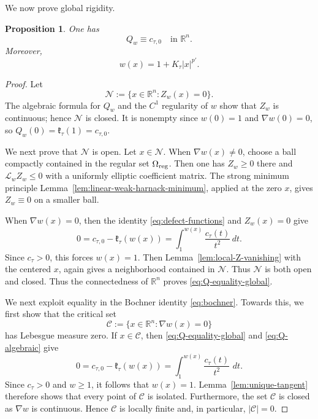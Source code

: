 \documentclass[reqno,12pt]{amsart}
\numberwithin{equation}{section}
\newtheorem{prop}[thm]{Proposition}
\theoremstyle{remark}
\newcommand{\R}{\mathbb R}
\newcommand{\dd}{\,d}
\newcommand{\Lscr}{\mathscr L}
\begin{document}
We now prove global rigidity.
\begin{prop}\label{prop:global-rigidity}
One has
\begin{equation}\label{eq:Q-equality-global}
Q_w\equiv c_{\tau,0}
\quad\text{in }\R^n.
\end{equation}
Moreover,
\begin{equation}\label{eq:w-explicit}
w(x)=1+K_\tau|x|^{p'}.
\end{equation}
\end{prop}

\begin{proof}
Let
$$
\mathcal N:=\{x\in\R^n:Z_w(x)=0\}.
$$
The algebraic formula for $Q_w$ and the $C^1$ regularity of $w$ show that $Z_w$ is continuous; hence $\mathcal N$ is closed.  It is nonempty since $w(0)=1$ and $\nabla w(0)=0$, so
$Q_w(0)=\mathfrak k_\tau(1)=c_{\tau,0}$.

We next prove that $\mathcal N$ is open.  Let $x\in\mathcal N$.  When $\nabla w(x)\ne0$, choose a ball compactly contained in the regular set $\Omega_{\rm reg}$.  Then one has $Z_w\ge 0$ there and $\Lscr_wZ_w\le0$ with a uniformly elliptic coefficient matrix.  The strong minimum principle Lemma~\ref{lem:linear-weak-harnack-minimum}, applied at the zero $x$, gives $Z_w\equiv0$ on a smaller ball.  

When $\nabla w(x)=0$, then the   identity \eqref{eq:defect-functions} and $Z_w(x)=0$ give
$$
 0=c_{\tau,0}-\mathfrak k_\tau(w(x))    =\int_1^{w(x)}\frac{c_\tau(t)}{t^2}\dd t.
$$
Since $c_\tau>0$, this forces $w(x)=1$. Then  Lemma~\ref{lem:local-Z-vanishing} with the centered  $x$, again gives a neighborhood contained in
$\mathcal N$.  Thus $\mathcal N$ is both open and closed.  Thus the connectedness of $\R^n$ proves \eqref{eq:Q-equality-global}.

We next exploit equality in the Bochner identity \eqref{eq:bochner}. 
Towards this, we first show that the critical set
$$
    \mathcal C:=\{x\in\R^n:\nabla w(x)=0\}
$$
has Lebesgue measure zero.  If $x\in\mathcal C$, then
\eqref{eq:Q-equality-global} and \eqref{eq:Q-algebraic} give
$$
0=c_{\tau,0}-\mathfrak k_\tau(w(x))
= \int_1^{w(x)}\frac{c_\tau(t)}{t^2}\,\dd t.
$$
Since $c_\tau>0$ and $w\ge1$, it follows that $w(x)=1$.
Lemma~\ref{lem:unique-tangent} therefore shows that every point of $\mathcal C$ is isolated.
Furthermore, the set $\mathcal C$ is closed as $\nabla w$ is continuous. Hence $\mathcal C$ is locally finite and, in particular, $|\mathcal C|=0.$



\end{proof}
\end{document}
